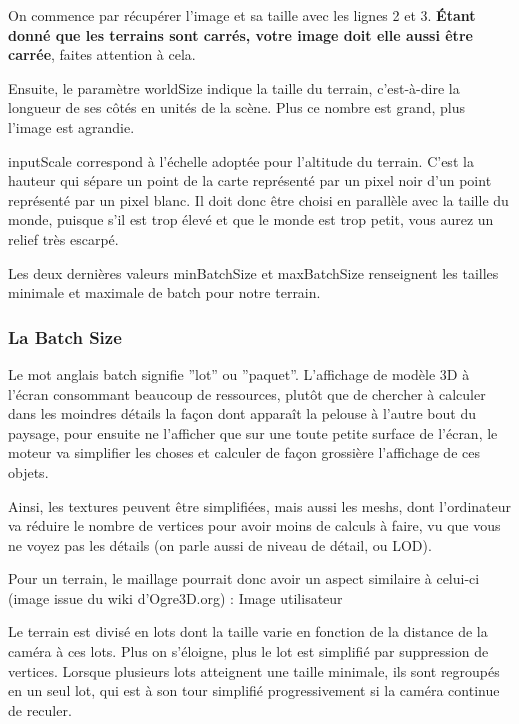 \documentclass[10pt,a4paper]{report}
\begin{document}
On commence par r\'ecup\'erer l'image et sa taille avec les lignes 2 et 3. \textbf{\'Etant donn\'e que les terrains sont carr\'es, votre image doit elle aussi \^etre carr\'ee}, faites attention \`a cela.

Ensuite, le param\`etre worldSize indique la taille du terrain, c'est-\`a-dire la longueur de ses c\^ot\'es en unit\'es de la sc\`ene. Plus ce nombre est grand, plus l'image est agrandie.

inputScale correspond \`a l'\'echelle adopt\'ee pour l'altitude du terrain. C'est la hauteur qui s\'epare un point de la carte repr\'esent\'e par un pixel noir d'un point repr\'esent\'e par un pixel blanc. Il doit donc \^etre choisi en parall\`ele avec la taille du monde, puisque s'il est trop \'elev\'e et que le monde est trop petit, vous aurez un relief tr\`es escarp\'e.

Les deux derni\`eres valeurs minBatchSize  et maxBatchSize  renseignent les tailles minimale et maximale de batch pour notre terrain.



\subsubsection{La Batch Size}


Le mot anglais batch signifie ''lot'' ou ''paquet''. L'affichage de mod\`ele 3D \`a l'\'ecran consommant beaucoup de ressources, plut\^ot que de chercher \`a calculer dans les moindres d\'etails la fa\c{c}on dont appara\^it la pelouse \`a l'autre bout du paysage, pour ensuite ne l'afficher que sur une toute petite surface de l'\'ecran, le moteur va simplifier les choses et calculer de fa\c{c}on grossi\`ere l'affichage de ces objets.

Ainsi, les textures peuvent \^etre simplifi\'ees, mais aussi les meshs, dont l'ordinateur va r\'eduire le nombre de vertices pour avoir moins de calculs \`a faire, vu que vous ne voyez pas les d\'etails (on parle aussi de niveau de d\'etail, ou LOD).

Pour un terrain, le maillage pourrait donc avoir un aspect similaire \`a celui-ci (image issue du wiki d'Ogre3D.org) :
Image utilisateur

Le terrain est divis\'e en lots dont la taille varie en fonction de la distance de la cam\'era \`a ces lots. Plus on s'\'eloigne, plus le lot est simplifi\'e par suppression de vertices. Lorsque plusieurs lots atteignent une taille minimale, ils sont regroup\'es en un seul lot, qui est \`a son tour simplifi\'e progressivement si la cam\'era continue de reculer.
\end{document}
